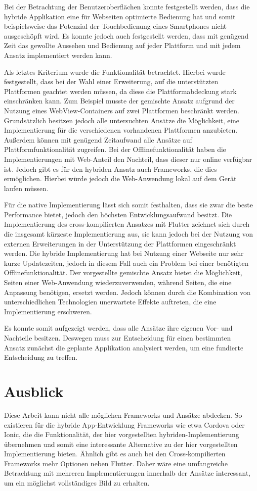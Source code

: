 Bei der Betrachtung der Benutzeroberflächen konnte festgestellt werden, dass die hybride Applikation eine für Webseiten optimierte Bedienung hat und somit beispielsweise das Potenzial der Touchbedienung eines Smartphones nicht ausgeschöpft wird. Es konnte jedoch auch festgestellt werden, dass mit genügend Zeit das gewollte Aussehen und Bedienung auf jeder Plattform und mit jedem Ansatz implementiert werden kann.

Als letztes Kriterium wurde die Funktionalität betrachtet. Hierbei wurde festgestellt, dass bei der Wahl einer Erweiterung, auf die unterstützten Plattformen geachtet werden müssen, da diese die Plattformabdeckung stark einschränken kann. Zum Beispiel musste der gemischte Ansatz aufgrund der Nutzung eines WebView-Containers auf zwei Plattformen beschränkt werden. Grundsätzlich besitzen jedoch alle untersuchten Ansätze die Möglichkeit, eine Implementierung für die verschiedenen vorhandenen Plattformen anzubieten. Außerdem können mit genügend Zeitaufwand alle Ansätze auf Plattformfunktionalität zugreifen. Bei der Offlinefunktionalität haben die Implementierungen mit Web-Anteil den Nachteil, dass dieser nur online verfügbar ist. Jedoch gibt es für den hybriden Ansatz auch Frameworks, die dies ermöglichen. Hierbei würde jedoch die Web-Anwendung lokal auf dem Gerät laufen müssen.

Für die native Implementierung lässt sich somit festhalten, dass sie zwar die beste Performance bietet, jedoch den höchsten Entwicklungsaufwand besitzt.
Die Implementierung des cross-kompilierten Ansatzes mit Flutter zeichnet sich durch die insgesamt kürzeste Implementierung aus, sie kann jedoch bei der Nutzung von externen Erweiterungen in der Unterstützung der Plattformen eingeschränkt werden. Die hybride Implementierung hat bei Nutzung einer Webseite nur sehr kurze Updatezeiten, jedoch in diesem Fall auch ein Problem bei einer benötigten Offlinefunktionalität. Der vorgestellte gemischte Ansatz bietet die Möglichkeit, Seiten einer Web-Anwendung wiederzuverwenden, während Seiten, die eine Anpassung benötigen, ersetzt werden. Jedoch können durch die Kombination von unterschiedlichen Technologien unerwartete Effekte auftreten, die eine Implementierung erschweren.

Es konnte somit aufgezeigt werden, dass alle Ansätze ihre eigenen Vor- und Nachteile besitzen. Deswegen muss zur Entscheidung für einen bestimmten Ansatz zunächst die geplante Applikation analysiert werden, um eine fundierte Entscheidung zu treffen.


\section{Ausblick}
Diese Arbeit kann nicht alle möglichen Frameworks und Ansätze abdecken. So existieren für die hybride App-Entwicklung Frameworks wie etwa Cordova oder Ionic, die die Funktionalität, der hier vorgestellten hybriden-Implementierung übernehmen und somit eine interessante Alternative zu der hier vorgestellten Implementierung bieten. Ähnlich gibt es auch bei den Cross-kompilierten Frameworks mehr Optionen neben Flutter. Daher wäre eine umfangreiche Betrachtung mit mehreren Implementierungen innerhalb der Ansätze interessant, um ein möglichst vollständiges Bild zu erhalten.

